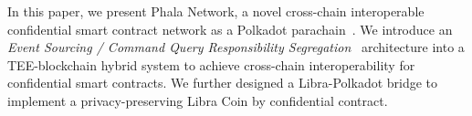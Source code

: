 
In this paper, we present Phala Network, a novel cross-chain interoperable confidential smart contract network as a Polkadot parachain~\cite{wood2016polkadot}. We introduce an \textit{Event Sourcing / Command Query Responsibility Segregation}~\cite{eventsourcing, cqrs} architecture into a TEE-blockchain hybrid system to achieve cross-chain interoperability for confidential smart contracts. We further designed a Libra-Polkadot bridge to implement a privacy-preserving Libra Coin by confidential contract.
